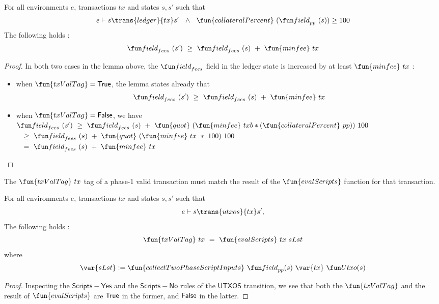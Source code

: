 \begin{property}
\begin{corollary}
  For all environments $e$, transactions $tx$ and states $s, s'$ such that
  \begin{equation*}
    e\vdash s\trans{ledger}{tx}s'~~\wedge~~\fun{collateralPercent}~(\field_{pp}~(s)) \geq 100
  \end{equation*}
  The following holds :
  \[\field_{fees}~(s')~\geq~\field_{fees}~(s)~+~\fun{minfee}~{tx} \]
\end{corollary}

\begin{proof}
  In both two cases in the lemma above, the $\field_{fees}$ field in the ledger state
  is increased by at least $\fun{minfee}~{tx}$ :
  \begin{itemize}
    \item when $\fun{txValTag} = \True$, the lemma states already that
    \[\field_{fees}~(s')~\geq~\field_{fees}~(s)~+~\fun{minfee}~{tx}\]
    \item when $\fun{txValTag} = \False$, we have
    $ \field_{fees}~(s')~\geq~\field_{fees}~(s)~+~\fun{quot}~(\fun{minfee}~{txb} * (\fun{collateralPercent}~pp))~100$ \\
    $~~~\geq~\field_{fees}~(s)~+~\fun{quot}~(\fun{minfee}~{tx}~*~100)~100$ \\
    $~~~=~\field_{fees}~(s)~+~\fun{minfee}~{tx}$
  \end{itemize}
\end{proof}

\end{property}

\begin{property}
  \label{prop:correct-tag}

The $\fun{txValTag}~tx$ tag of a phase-1 valid transaction must match the result of the $\fun{evalScripts}$
function for that transaction.

\begin{lemma}
  For all environments $e$, transactions $tx$ and states $s, s'$ such that
  \begin{equation*}
    e\vdash s\trans{utxos}{tx}s',
  \end{equation*}
  The following holds :
    \[\fun{txValTag}~tx ~=~ \fun{evalScripts}~{tx}~{sLst} \]
  where
  \[ \var{sLst} \leteq \fun{collectTwoPhaseScriptInputs} ~\field_{pp}(s)~\var{tx}~ \Utxo(s) \]
\end{lemma}
\begin{proof}
  Inspecting the $\mathsf{Scripts{-}Yes}$ and the $\mathsf{Scripts{-}No}$ rules of the $\mathsf{UTXOS}$ transition,
  we see that both the $\fun{txValTag}$ and the result of $\fun{evalScripts}$
  are $\mathsf{True}$ in the former, and $\mathsf{False}$ in the latter.
\end{proof}
\end{property}

